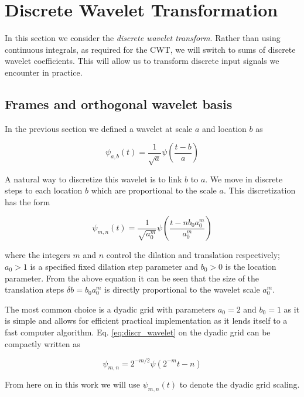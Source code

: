 \section{Discrete Wavelet Transformation}
In this section we consider the \textit{discrete wavelet transform}. Rather than using continuous integrals, as required for the CWT, we will switch to sums of discrete wavelet
coefficients. This will allow us to transform discrete input signals we encounter in practice. 

\subsection{Frames and orthogonal wavelet basis}

In the previous section we defined a wavelet at scale $a$ and location $b$ as 

\begin{equation}
    \psi_{a,b}(t) = \frac{1}{\sqrt{a}} \psi\left(\frac{t-b}{a}\right)
\end{equation}

A natural way to discretize this wavelet is to link $b$ to $a$. We move in discrete steps to each location $b$ which are proportional to the scale $a$. This
discretization has the form

\begin{equation}
    \psi_{m, n}(t) = \frac{1}{\sqrt{a_0^m}} \psi\left(\frac{t-nb_0a_0^m}{a_0^m}\right)
    \label{eq:discr_wavelet}
\end{equation}

where the integers $m$ and $n$ control the dilation and translation respectively; $a_0>1$ is a specified fixed dilation step parameter and $b_0>0$ is the location parameter.
From the above equation it can be seen that the size of the translation steps $\delta b=b_0 a_0^m$ is directly proportional to the wavelet scale $a_0^m$.

The most common choice is a dyadic grid with parameters $a_0=2$ and $b_0=1$ as it is simple and allows for efficient practical implementation as it lends
itself to a fast computer algorithm. Eq. \ref{eq:discr_wavelet} on the dyadic grid can be compactly written as 

\begin{equation}
    \psi_{m,n} = 2^{-m/2} \psi(2^{-m}t - n)
\end{equation}

From here on in this work we will use $\psi_{m,n}(t)$ to denote the dyadic grid scaling.

